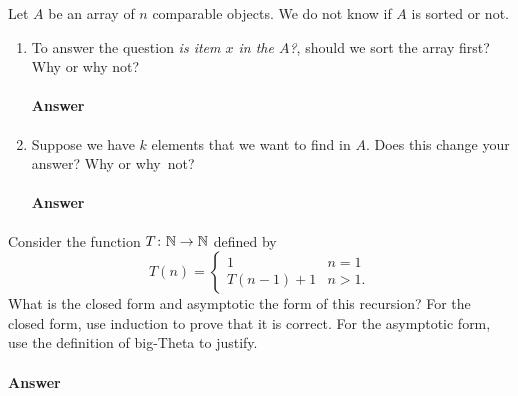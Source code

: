\documentclass{article}
\begin{document}
\collab{\todo{}}
Let $A$ be an array of $n$ comparable objects.  We do not know if $A$ is sorted
or not.

\begin{enumerate}
    \item To answer the question \emph{is item $x$ in the $A$?}, should we
        sort the array first?  Why or why not?

        \paragraph{Answer}
        \todo{}

    \item Suppose we have $k$ elements that we want to find in $A$. Does this
        change your answer? Why or why~not?

        \paragraph{Answer}
        \todo{}

\end{enumerate}

\collab{\todo{}}
Consider the function $T \colon {\mathbb N} \to {\mathbb N}$ defined by
$$T(n) = \begin{cases}
            1        & n=1\\
            T(n-1)+1 & n>1.
         \end{cases}
$$
What is the closed form and asymptotic the form of this recursion?  For the
closed form, use induction to prove that it is correct.  For the asymptotic
form, use the definition of big-Theta to justify.

\paragraph{Answer}
\todo{}


\collab{\todo{}}
\end{document}
